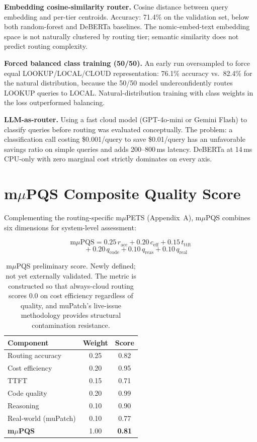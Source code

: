 \documentclass[11pt]{article}
\begin{document}
\textbf{Embedding cosine-similarity router.} Cosine distance between
query embedding and per-tier centroids. Accuracy: 71.4\% on the
validation set, below both random-forest and DeBERTa baselines. The
nomic-embed-text embedding space is not naturally clustered by routing
tier; semantic similarity does not predict routing complexity.

\textbf{Forced balanced class training (50/50).} An early run oversampled
to force equal LOOKUP/LOCAL/CLOUD representation: 76.1\% accuracy vs.\
82.4\% for the natural distribution, because the 50/50 model
underconfidently routes LOOKUP queries to LOCAL. Natural-distribution
training with class weights in the loss outperformed balancing.

\textbf{LLM-as-router.} Using a fast cloud model (GPT-4o-mini or Gemini
Flash) to classify queries before routing was evaluated conceptually.
The problem: a classification call costing \$0.001/query to save
\$0.01/query has an unfavorable savings ratio on simple queries and adds
200--800\,ms latency. DeBERTa at 14\,ms CPU-only with zero marginal cost
strictly dominates on every axis.

\section{m$\mu$PQS Composite Quality Score}
\label{sec:mpqs}

Complementing the routing-specific m$\mu$PETS (Appendix~A), m$\mu$PQS
combines six dimensions for system-level assessment:

\[
\text{m}\mu\text{PQS} = 0.25\,r_{\text{acc}} + 0.20\,c_{\text{eff}} + 0.15\,t_{\text{ttft}}
\]
\[
\quad\;\, + 0.20\,q_{\text{code}} + 0.10\,q_{\text{reas}} + 0.10\,q_{\text{real}}
\]

\begin{table}[h]
\centering
\small
\begin{tabular}{lcc}
\toprule
\textbf{Component} & \textbf{Weight} & \textbf{Score} \\
\midrule
Routing accuracy & 0.25 & 0.82 \\
Cost efficiency & 0.20 & 0.95 \\
TTFT & 0.15 & 0.71 \\
Code quality & 0.20 & 0.99 \\
Reasoning & 0.10 & 0.90 \\
Real-world (muPatch) & 0.10 & 0.77 \\
\midrule
\textbf{m$\mu$PQS} & 1.00 & \textbf{0.81} \\
\bottomrule
\end{tabular}
\caption{m$\mu$PQS preliminary score. Newly defined; not yet externally validated. The metric is constructed so that always-cloud routing scores 0.0 on cost efficiency regardless of quality, and muPatch's live-issue methodology provides structural contamination resistance.}
\label{tab:mpqs}
\end{table}
\end{document}
